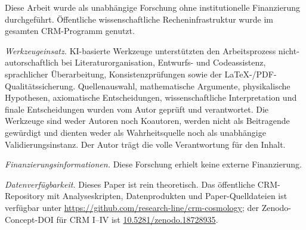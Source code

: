 \documentclass[aps,prd,twocolumn,superscriptaddress,nofootinbib]{revtex4-2}
\begin{document}
\begin{acknowledgments}
Diese Arbeit wurde als unabhängige Forschung ohne institutionelle Finanzierung durchgeführt. Öffentliche wissenschaftliche Recheninfrastruktur wurde im gesamten CRM-Programm genutzt.

\textit{Werkzeugeinsatz.} KI-basierte Werkzeuge unterstützten den Arbeitsprozess nicht-autorschaftlich bei Literaturorganisation, Entwurfs- und Codeassistenz, sprachlicher Überarbeitung, Konsistenzprüfungen sowie der \LaTeX-/PDF-Qualitätssicherung. Quellenauswahl, mathematische Argumente, physikalische Hypothesen, axiomatische Entscheidungen, wissenschaftliche Interpretation und finale Entscheidungen wurden vom Autor geprüft und verantwortet. Die Werkzeuge sind weder Autoren noch Koautoren, werden nicht als Beitragende gewürdigt und dienten weder als Wahrheitsquelle noch als unabhängige Validierungsinstanz. Der Autor trägt die volle Verantwortung für den Inhalt.

\textit{Finanzierungsinformationen.} Diese Forschung erhielt keine externe Finanzierung.

\textit{Datenverfügbarkeit.} Dieses Paper ist rein theoretisch. Das öffentliche CRM-Repository mit Analyseskripten, Datenprodukten und Paper-Quelldateien ist verfügbar unter \url{https://github.com/research-line/crm-cosmology}; der Zenodo-Concept-DOI für CRM I--IV ist \href{https://doi.org/10.5281/zenodo.18728935}{10.5281/zenodo.18728935}.
\end{acknowledgments}


\end{document}
